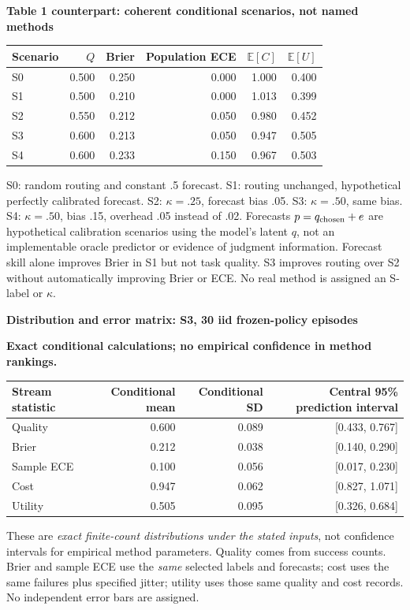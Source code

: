 \documentclass[10pt,a4paper]{article}
\newcommand{\lead}[1]{\vspace{3pt}\textbf{#1}\par}
\newcommand{\status}{\textcolor{red!70!black}{\textbf{Exact conditional calculations; no empirical confidence in method rankings.}}\par}
\begin{document}
\lead{Table 1 counterpart: coherent conditional scenarios, not named methods}
\begin{center}\small
\begin{tabular*}{\linewidth}{@{\extracolsep{\fill}}lrrrrr@{}}\toprule
Scenario & $Q$ & Brier & Population ECE & $\mathbb E[C]$ & $\mathbb E[U]$\\\midrule
S0 & 0.500 & 0.250 & 0.000 & 1.000 & 0.400\\
S1 & 0.500 & 0.210 & 0.000 & 1.013 & 0.399\\
S2 & 0.550 & 0.212 & 0.050 & 0.980 & 0.452\\
S3 & 0.600 & 0.213 & 0.050 & 0.947 & 0.505\\
S4 & 0.600 & 0.233 & 0.150 & 0.967 & 0.503\\
\bottomrule\end{tabular*}\end{center}
S0: random routing and constant .5 forecast. S1: routing unchanged, hypothetical
perfectly calibrated forecast. S2: $\kappa=.25$, forecast bias .05. S3:
$\kappa=.50$, same bias. S4: $\kappa=.50$, bias .15, overhead .05 instead of .02.
Forecasts $p=q_{\rm chosen}+e$ are hypothetical calibration scenarios using the
model's latent $q$, not an implementable oracle predictor or evidence of judgment
information. Forecast skill alone improves Brier in S1 but not task quality.
S3 improves routing over S2 without automatically improving Brier or ECE.
No real method is assigned an S-label or $\kappa$.

\clearpage
\lead{Distribution and error matrix: S3, 30 iid frozen-policy episodes}\status
\begin{center}\small
\begin{tabular*}{\linewidth}{@{\extracolsep{\fill}}lrrr@{}}\toprule
Stream statistic & Conditional mean & Conditional SD & Central 95\% prediction interval\\\midrule
Quality & 0.600 & 0.089 & [0.433, 0.767]\\
Brier & 0.212 & 0.038 & [0.140, 0.290]\\
Sample ECE & 0.100 & 0.056 & [0.017, 0.230]\\
Cost & 0.947 & 0.062 & [0.827, 1.071]\\
Utility & 0.505 & 0.095 & [0.326, 0.684]\\
\bottomrule\end{tabular*}\end{center}
These are \emph{exact finite-count distributions under the stated inputs}, not
confidence intervals for empirical method parameters. Quality comes from
success counts. Brier and sample ECE use the \emph{same} selected labels and
forecasts; cost uses the same failures plus specified jitter; utility uses
those same quality and cost records. No independent error bars are assigned.
\end{document}
